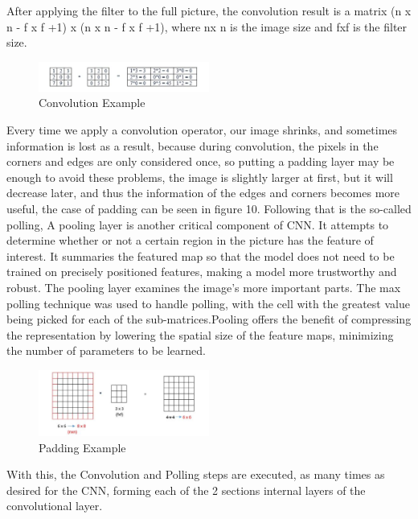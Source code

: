 \documentclass[conference]{IEEEtran}
\begin{document}
After applying the filter to the full picture, the convolution result is a matrix (n x n - f x f +1) x (n x n - f x f +1), where nx n is the image size and fxf is the filter size.

\begin{figure}[H]
\centering
    \includegraphics[width=0.5\textwidth]{images/ConvolutionExample.png}
    \caption{Convolution Example}
\end{figure}

Every time we apply a convolution operator, our image shrinks, and sometimes information is lost as a result, because during convolution, the pixels in the corners and edges are only considered once, so putting a padding layer may be enough to avoid these problems, the image is slightly larger at first, but it will decrease later, and thus the information of the edges and corners becomes more useful, the case of padding can be seen in figure 10. Following that is the so-called polling, A pooling layer is another critical component of CNN. It attempts to determine whether or not a certain region in the picture has the feature of interest. It summaries the featured map so that the model does not need to be trained on precisely positioned features, making a model more trustworthy and robust. The pooling layer examines the image’s more important parts. The max polling technique was used to handle polling, with the cell with the greatest value being picked for each of the sub-matrices.Pooling offers the benefit of compressing the representation by lowering the spatial size of the feature maps, minimizing the number of parameters to be learned.

\begin{figure}[H]
\centering
    \includegraphics[width=0.5\textwidth]{images/PaddingExample.png}
    \caption{Padding Example}
\end{figure}

With this, the Convolution and Polling steps are executed, as many times as desired for the CNN, forming each of the 2 sections internal layers of the convolutional layer.
\end{document}
